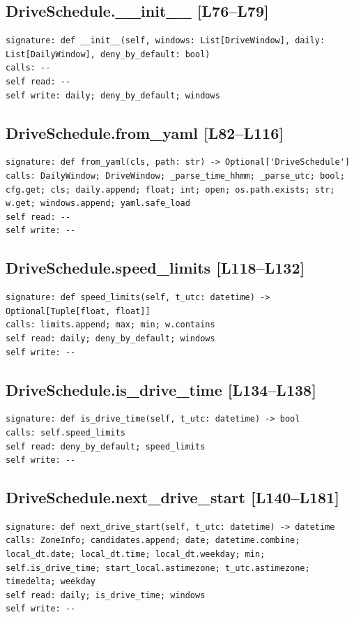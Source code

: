 \documentclass[a4paper,10pt,oneside]{book}
\begin{document}
\subsection*{DriveSchedule.\_\_init\_\_ [L76--L79]}
\begin{lstlisting}[numbers=none]
signature: def __init__(self, windows: List[DriveWindow], daily: List[DailyWindow], deny_by_default: bool)
calls: --
self read: --
self write: daily; deny_by_default; windows
\end{lstlisting}
\subsection*{DriveSchedule.from\_yaml [L82--L116]}
\begin{lstlisting}[numbers=none]
signature: def from_yaml(cls, path: str) -> Optional['DriveSchedule']
calls: DailyWindow; DriveWindow; _parse_time_hhmm; _parse_utc; bool; cfg.get; cls; daily.append; float; int; open; os.path.exists; str; w.get; windows.append; yaml.safe_load
self read: --
self write: --
\end{lstlisting}
\subsection*{DriveSchedule.speed\_limits [L118--L132]}
\begin{lstlisting}[numbers=none]
signature: def speed_limits(self, t_utc: datetime) -> Optional[Tuple[float, float]]
calls: limits.append; max; min; w.contains
self read: daily; deny_by_default; windows
self write: --
\end{lstlisting}
\subsection*{DriveSchedule.is\_drive\_time [L134--L138]}
\begin{lstlisting}[numbers=none]
signature: def is_drive_time(self, t_utc: datetime) -> bool
calls: self.speed_limits
self read: deny_by_default; speed_limits
self write: --
\end{lstlisting}
\subsection*{DriveSchedule.next\_drive\_start [L140--L181]}
\begin{lstlisting}[numbers=none]
signature: def next_drive_start(self, t_utc: datetime) -> datetime
calls: ZoneInfo; candidates.append; date; datetime.combine; local_dt.date; local_dt.time; local_dt.weekday; min; self.is_drive_time; start_local.astimezone; t_utc.astimezone; timedelta; weekday
self read: daily; is_drive_time; windows
self write: --
\end{lstlisting}
\end{document}
